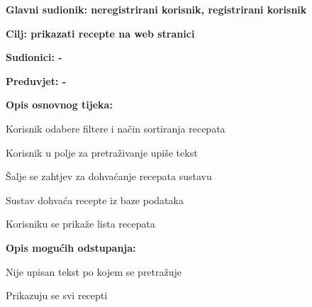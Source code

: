 					\noindent {}
					\begin{packed_item}
						\item \textbf{Glavni sudionik: neregistrirani korisnik, registrirani korisnik}
						\item  \textbf{Cilj: prikazati recepte na web stranici}
						\item  \textbf{Sudionici: -}
						\item  \textbf{Preduvjet: -}
						
						\item  \textbf{Opis osnovnog tijeka:}
						\item[] \begin{packed_enum}
							\item Korisnik odabere filtere i način sortiranja recepata
							\item Korisnik u polje za pretraživanje upiše tekst
							\item Šalje se zahtjev za dohvaćanje recepata sustavu
							\item Sustav dohvaća recepte iz baze podataka
							\item Korisniku se prikaže lista recepata
						\end{packed_enum}
						
						\item  \textbf{Opis mogućih odstupanja:}
						\item[] \begin{packed_item}
							\item [2.a] Nije upisan tekst po kojem se pretražuje
							\item[] \begin{packed_enum}
								\item Prikazuju se svi recepti
							\end{packed_enum}
						\end{packed_item}
					\end{packed_item}


